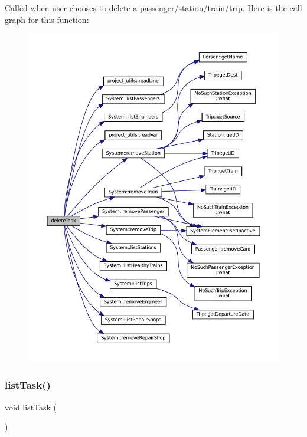 Called when user chooses to delete a passenger/station/train/trip. Here is the call graph for this function\+:
\nopagebreak
\begin{figure}[H]
\begin{center}
\leavevmode
\includegraphics[width=350pt]{Train-System_8cpp_a707ef45664b3d98b60124d73406d1d7e_cgraph}
\end{center}
\end{figure}
\mbox{\label{Train-System_8cpp_a21054ad0cdbd7095b27ef9ac3396495b}} 
\subsubsection{\texorpdfstring{list\+Task()}{listTask()}}
{\footnotesize\ttfamily void list\+Task (\begin{DoxyParamCaption}{ }\end{DoxyParamCaption})}

